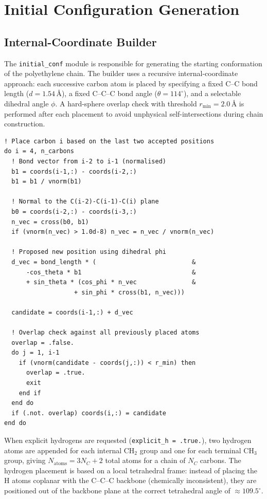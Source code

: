 
\section{Initial Configuration Generation}
\label{sec:initial_conf}

\subsection{Internal-Coordinate Builder}

The \texttt{initial\_conf} module is responsible for generating the starting
conformation of the polyethylene chain. The builder uses a recursive
internal-coordinate approach: each successive carbon atom is placed by
specifying a fixed C--C bond length ($d = 1.54\,\text{\AA}$), a fixed C--C--C
bond angle ($\theta = 114^\circ$), and a selectable dihedral angle $\phi$.
A hard-sphere overlap check with threshold $r_{\min} = 2.0\,\text{\AA}$ is
performed after each placement to avoid unphysical self-intersections during
chain construction.

\begin{lstlisting}[caption={Core internal-coordinate placement loop in \texttt{initial\_conf.f90}.}]
! Place carbon i based on the last two accepted positions
do i = 4, n_carbons
  ! Bond vector from i-2 to i-1 (normalised)
  b1 = coords(i-1,:) - coords(i-2,:)
  b1 = b1 / vnorm(b1)

  ! Normal to the C(i-2)-C(i-1)-C(i) plane
  b0 = coords(i-2,:) - coords(i-3,:)
  n_vec = cross(b0, b1)
  if (vnorm(n_vec) > 1.0d-8) n_vec = n_vec / vnorm(n_vec)

  ! Proposed new position using dihedral phi
  d_vec = bond_length * (                          &
      -cos_theta * b1                              &
      + sin_theta * (cos_phi * n_vec               &
                   + sin_phi * cross(b1, n_vec)))

  candidate = coords(i-1,:) + d_vec

  ! Overlap check against all previously placed atoms
  overlap = .false.
  do j = 1, i-1
    if (vnorm(candidate - coords(j,:)) < r_min) then
      overlap = .true.
      exit
    end if
  end do
  if (.not. overlap) coords(i,:) = candidate
end do
\end{lstlisting}

When explicit hydrogens are requested (\texttt{explicit\_h = .true.}), two
hydrogen atoms are appended for each internal CH$_2$ group and one for each
terminal CH$_3$ group, giving $N_{\text{atoms}} = 3N_C + 2$ total atoms for
a chain of $N_C$ carbons. The hydrogen placement is based on a local tetrahedral
frame: instead of placing the H atoms coplanar with the C--C--C backbone (chemically inconsistent), they are positioned out of the
backbone plane at the correct tetrahedral angle of $\approx 109.5^\circ$.

